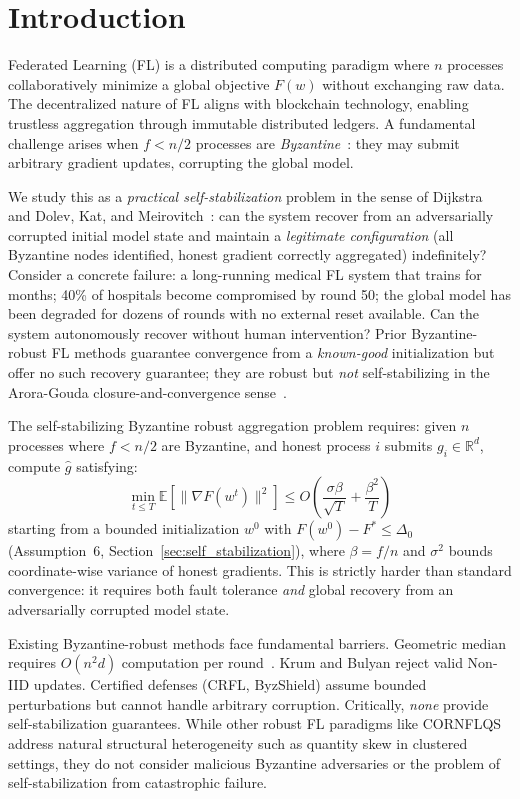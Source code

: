 \section{Introduction}

Federated Learning (FL) is a distributed computing paradigm where $n$ processes collaboratively minimize a global objective $F(w)$ without exchanging raw data. The decentralized nature of FL aligns with blockchain technology, enabling trustless aggregation through immutable distributed ledgers. A fundamental challenge arises when $f < n/2$ processes are \emph{Byzantine}~\cite{byzantine_generals}: they may submit arbitrary gradient updates, corrupting the global model.

We study this as a \emph{practical self-stabilization} problem in the sense of Dijkstra~\cite{dijkstra_self_stab} and Dolev, Kat, and Meirovitch~\cite{dolev_kat_practical}: can the system recover from an adversarially corrupted initial model state and maintain a \emph{legitimate configuration} (all Byzantine nodes identified, honest gradient correctly aggregated) indefinitely?
Consider a concrete failure: a long-running medical FL system that trains for months; 40\% of hospitals become compromised by round 50; the global model has been degraded for dozens of rounds with no external reset available. Can the system autonomously recover without human intervention?
Prior Byzantine-robust FL methods guarantee convergence from a \emph{known-good} initialization but offer no such recovery guarantee; they are robust but \emph{not} self-stabilizing in the Arora-Gouda closure-and-convergence sense~\cite{arora_gouda}.

The self-stabilizing Byzantine robust aggregation problem requires: given $n$ processes where $f < n/2$ are Byzantine, and honest process $i$ submits $g_i \in \mathbb{R}^d$, compute $\hat{g}$ satisfying:
\begin{equation}
\min_{t \leq T}\mathbb{E}[\|\nabla F(w^t)\|^2] \leq O\left(\frac{\sigma\beta}{\sqrt{T}} + \frac{\beta^2}{T}\right)
\end{equation}
starting from a bounded initialization $w^0$ with $F(w^0)-F^* \leq \Delta_0$ (Assumption~6, Section~\ref{sec:self_stabilization}), where $\beta = f/n$ and $\sigma^2$ bounds coordinate-wise variance of honest gradients. This is strictly harder than standard convergence: it requires both fault tolerance \emph{and} global recovery from an adversarially corrupted model state.

Existing Byzantine-robust methods face fundamental barriers. Geometric median requires $O(n^2 d)$ computation per round~\cite{geometric_median}. Krum and Bulyan reject valid Non-IID updates. Certified defenses (CRFL, ByzShield) assume bounded perturbations but cannot handle arbitrary corruption. Critically, \emph{none} provide self-stabilization guarantees. While other robust FL paradigms like CORNFLQS~\cite{cornflqs} address natural structural heterogeneity such as quantity skew in clustered settings, they do not consider malicious Byzantine adversaries or the problem of self-stabilization from catastrophic failure.


